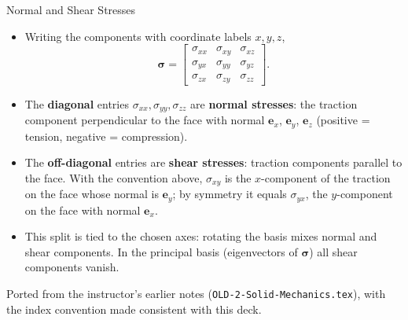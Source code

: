 \documentclass[aspectratio=169,11pt]{beamer}
\begin{document}
\begin{frame}{Normal and Shear Stresses}
\begin{itemize}
\item Writing the components with coordinate labels $x,y,z$,
\[
\boldsymbol{\sigma}=
\begin{bmatrix}
\sigma_{xx} & \sigma_{xy} & \sigma_{xz}\\
\sigma_{yx} & \sigma_{yy} & \sigma_{yz}\\
\sigma_{zx} & \sigma_{zy} & \sigma_{zz}
\end{bmatrix}.
\]
\item The \textbf{diagonal} entries $\sigma_{xx},\sigma_{yy},\sigma_{zz}$ are \textbf{normal stresses}: the traction component perpendicular to the face with normal $\mathbf{e}_x$, $\mathbf{e}_y$, $\mathbf{e}_z$ (positive = tension, negative = compression).
\item The \textbf{off-diagonal} entries are \textbf{shear stresses}: traction components parallel to the face. With the convention above, $\sigma_{xy}$ is the $x$-component of the traction on the face whose normal is $\mathbf{e}_y$; by symmetry it equals $\sigma_{yx}$, the $y$-component on the face with normal $\mathbf{e}_x$.
\item This split is tied to the chosen axes: rotating the basis mixes normal and shear components. In the principal basis (eigenvectors of $\boldsymbol{\sigma}$) all shear components vanish.
\end{itemize}
\vspace{1mm}
{\tiny\color{DarkGray}Ported from the instructor's earlier notes (\texttt{OLD-2-Solid-Mechanics.tex}), with the index convention made consistent with this deck.\par}
\end{frame}
\end{document}
